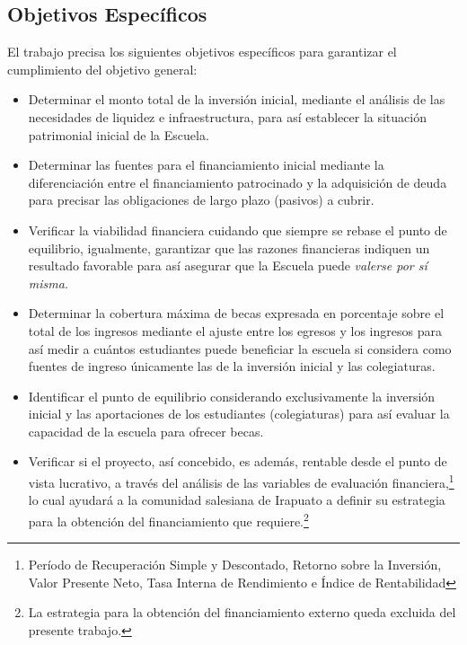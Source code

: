 

\subsection{Objetivos Específicos}
\label{sub:ObjetivosEspecificos}

El trabajo precisa los siguientes objetivos específicos para garantizar el cumplimiento del objetivo general:

\begin{itemize}
	\item Determinar el monto total de la inversión inicial, mediante el análisis de las necesidades de liquidez e infraestructura, para así establecer la situación patrimonial inicial de la Escuela.
	\item Determinar las fuentes para el financiamiento inicial mediante la diferenciación entre el financiamiento patrocinado y la adquisición de deuda para precisar las obligaciones de largo plazo (pasivos) a cubrir.
	\item Verificar la viabilidad financiera cuidando que siempre se rebase el punto de equilibrio, igualmente, garantizar que las razones financieras indiquen un resultado favorable para así asegurar que la Escuela puede \emph{valerse por sí misma}.
	\item Determinar la cobertura máxima de becas expresada en porcentaje sobre el total de los ingresos mediante el ajuste entre los egresos y los ingresos para así medir a cuántos estudiantes puede beneficiar la escuela si considera como fuentes de ingreso únicamente las de la inversión inicial y las colegiaturas.
	\item Identificar el punto de equilibrio considerando exclusivamente la inversión inicial y las aportaciones de los estudiantes (colegiaturas) para así evaluar la capacidad de la escuela para ofrecer becas.
	\item Verificar si el proyecto, así concebido, es además, rentable desde el punto de vista lucrativo, a través del análisis de las variables de evaluación financiera,\footnote{\label{note:VariablesEvaluacionFinanciera}Período de Recuperación Simple y Descontado, Retorno sobre la Inversión, Valor Presente Neto, Tasa Interna de Rendimiento e Índice de Rentabilidad} lo cual ayudará a la comunidad salesiana de Irapuato a definir su estrategia para la obtención del financiamiento que requiere.\footnote{La estrategia para la obtención del financiamiento externo queda excluida del presente trabajo.}
\end{itemize}

